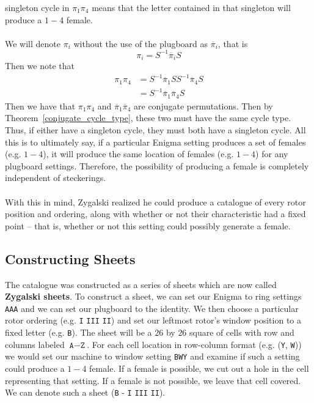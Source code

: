 singleton cycle in $\pi_1\pi_4$ means that the letter contained
in that singleton will produce a $1-4$ female.
\\\\We will denote $\pi_i$ without the use of the plugboard as
$\overline\pi_i$, that is
\[
  \pi_i = S^{-1}\overline\pi_i S
\]
Then we note that
\begin{align*}
  \pi_1\pi_4 & = S^{-1}\overline\pi_1 SS^{-1} \overline\pi_4 S \\
  & = S^{-1} \overline\pi_1\overline\pi_4 S
\end{align*}
Then we have that $\pi_1\pi_4$ and
$\overline\pi_1\overline\pi_4$ are conjugate permutations. Then
by Theorem~\ref{conjugate_cycle_type}, these two must have the same
cycle type. Thus, if either have a singleton cycle, they must both
have a singleton cycle. All this is to ultimately say, if  a
particular Enigma setting produces a set of females (e.g. $1-4$), it
will produce the same location of females (e.g. $1-4$) for any
plugboard settings. Therefore, the possibility of producing a female is
completely independent of steckerings.
\\\\With this in mind, Zygalski realized he could produce a catalogue
of every rotor position and ordering, along with whether or not their
characteristic had a fixed point -- that is, whether or not this
setting could possibly generate a female.

\subsection{Constructing Sheets}
The catalogue was constructed as a series of sheets which are now
called {\bf{Zygalski sheets}}. To construct a sheet, we can set our
Enigma to ring settings \texttt{AAA} and we can set our plugboard to
the identity. We then choose a particular rotor ordering (e.g.
\texttt{I} \texttt{III} \texttt{II}) and set our leftmost rotor's
window position to a fixed letter (e.g. \texttt{B}). The sheet will
be a $26$ by $26$ square of cells with row and columns labeled
$\texttt{A}-\texttt{Z}$. For each cell location in row-column format
(e.g. (\texttt{Y}, \texttt{W})) we would set our machine to window
setting \texttt{BWY} and examine if such a setting could produce a
$1-4$ female. If a female is possible, we cut out a hole in the cell
representing that setting. If a female is not possible, we leave that
cell covered. We can denote such a sheet (\texttt{B} - \texttt{I}
\texttt{III} \texttt{II}).

